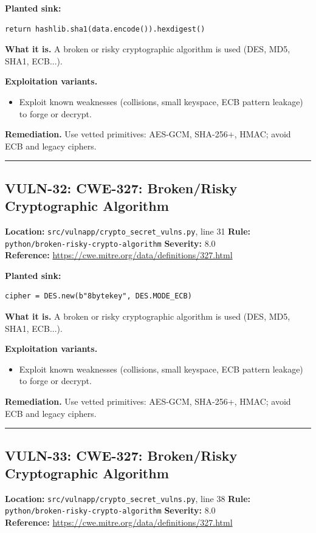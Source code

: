 \documentclass[11pt,a4paper]{article}
\begin{document}
\noindent\textbf{Planted sink:}
\begin{lstlisting}
return hashlib.sha1(data.encode()).hexdigest()
\end{lstlisting}
\noindent\textbf{What it is.} A broken or risky cryptographic algorithm is used (DES, MD5, SHA1, ECB...).

\noindent\textbf{Exploitation variants.}
\begin{itemize}[leftmargin=1.4em,itemsep=1pt,topsep=2pt]
\item Exploit known weaknesses (collisions, small keyspace, ECB pattern leakage) to forge or decrypt.
\end{itemize}
\noindent\textbf{Remediation.} Use vetted primitives: AES-GCM, SHA-256+, HMAC; avoid ECB and legacy ciphers.

\vspace{4pt}\hrule\vspace{6pt}
\subsection{VULN-32: CWE-327: Broken/Risky Cryptographic Algorithm}
\noindent\textbf{Location:} \texttt{src/vulnapp/crypto\_secret\_vulns.py}, line 31 \quad \textbf{Rule:} \texttt{python/broken-risky-crypto-algorithm} \quad \textbf{Severity:} 8.0
\\ \textbf{Reference:} \url{https://cwe.mitre.org/data/definitions/327.html}

\noindent\textbf{Planted sink:}
\begin{lstlisting}
cipher = DES.new(b"8bytekey", DES.MODE_ECB)
\end{lstlisting}
\noindent\textbf{What it is.} A broken or risky cryptographic algorithm is used (DES, MD5, SHA1, ECB...).

\noindent\textbf{Exploitation variants.}
\begin{itemize}[leftmargin=1.4em,itemsep=1pt,topsep=2pt]
\item Exploit known weaknesses (collisions, small keyspace, ECB pattern leakage) to forge or decrypt.
\end{itemize}
\noindent\textbf{Remediation.} Use vetted primitives: AES-GCM, SHA-256+, HMAC; avoid ECB and legacy ciphers.

\vspace{4pt}\hrule\vspace{6pt}
\subsection{VULN-33: CWE-327: Broken/Risky Cryptographic Algorithm}
\noindent\textbf{Location:} \texttt{src/vulnapp/crypto\_secret\_vulns.py}, line 38 \quad \textbf{Rule:} \texttt{python/broken-risky-crypto-algorithm} \quad \textbf{Severity:} 8.0
\\ \textbf{Reference:} \url{https://cwe.mitre.org/data/definitions/327.html}
\end{document}
